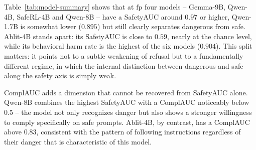 \documentclass[10pt,twocolumn]{article}
\newcommand{\fp}{\mathrm{fp}}
\begin{document}
Table~\ref{tab:model-summary} shows that at $\fp$ four models -- Gemma-9B, Qwen-4B,
SafeRL-4B and Qwen-8B -- have a SafetyAUC around $0.97$ or higher, Qwen-1.7B is somewhat lower
($0.895$) but still clearly separates dangerous from safe. Ablit-4B stands apart:
its SafetyAUC is close to $0.59$, nearly at the chance level, while its
behavioral harm rate is the highest of the six models ($0.904$). This split matters:
it points not to a subtle weakening of refusal but to a fundamentally different regime, in which the
internal distinction between dangerous and safe along the safety axis is simply weak.

ComplAUC adds a dimension that cannot be recovered from SafetyAUC alone. Qwen-8B
combines the highest SafetyAUC with a ComplAUC noticeably below $0.5$ -- the model not only
recognizes danger but also shows a stronger willingness to comply specifically on
safe prompts. Ablit-4B, by contrast, has a ComplAUC above $0.83$, consistent with the
pattern of following instructions regardless of their danger that is characteristic of this model.
\end{document}
